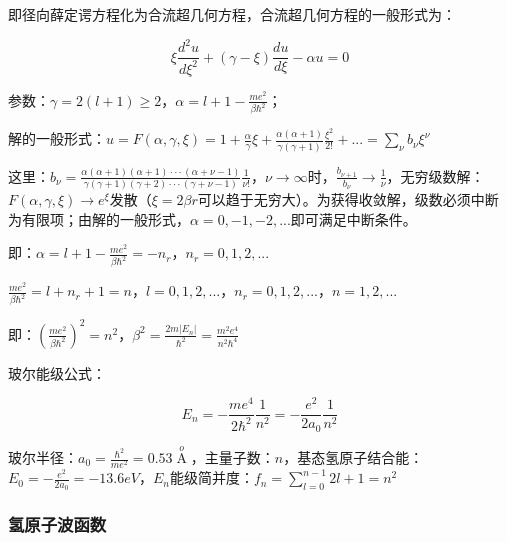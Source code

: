 即径向薛定谔方程化为合流超几何方程，合流超几何方程的一般形式为：


\begin{equation}\label{15-13}
\xi \frac{{d^2 u}}{{d\xi ^2 }} + \left( {\gamma  - \xi } \right)\frac{{du}}{{d\xi }} - \alpha u = 0
\end{equation}

参数：$\gamma  = 2(l + 1) \ge 2$，$\alpha  = l + 1 - \frac{{me^2 }}{{\beta \hbar ^2 }}$；

解的一般形式：$u = F\left( {\alpha ,\gamma ,\xi } \right) = 1 + \frac{\alpha }{\gamma }\xi  + \frac{{\alpha \left( {\alpha  + 1} \right)}}{{\gamma \left( {\gamma  + 1} \right)}}\frac{{\xi ^2 }}{{2!}} + ... = \sum\limits_\nu  {b_\nu  \xi ^\nu  } $

这里：$b_\nu   = \frac{{\alpha \left( {\alpha  + 1} \right)\left( {\alpha  + 1} \right) \cdot  \cdot  \cdot \left( {\alpha  + \nu  - 1} \right)}}{{\gamma \left( {\gamma  + 1} \right)\left( {\gamma  + 2} \right) \cdot  \cdot  \cdot \left( {\gamma  + \nu  - 1} \right)}}\frac{1}{{\nu !}}$，$\nu  \to \infty $时，$\frac{{b_{\nu  + 1} }}{{b_\nu  }} \to \frac{1}{\nu }$，无穷级数解：$F\left( {\alpha ,\gamma ,\xi } \right) \to e^\xi  $发散（$\xi  = 2\beta r$可以趋于无穷大）。为获得收敛解，级数必须中断为有限项；由解的一般形式，$\alpha  = 0, - 1, - 2,...$即可满足中断条件。

即：$\alpha  = l + 1 - \frac{{me^2 }}{{\beta \hbar ^2 }} =  - n_r $，$n_r  = 0,1,2,...$


$\frac{{me^2 }}{{\beta \hbar ^2 }} = l + n_r  + 1 = n$，$l = 0,1,2,...$，$n_r  = 0,1,2,...$，$n = 1,2,...$

即：$\left( {\frac{{me^2 }}{{\beta \hbar ^2 }}} \right)^2  = n^2 $，$\beta ^2  = \frac{{2m\left| {E_n } \right|}}{{\hbar ^2 }} = \frac{{m^2 e^4 }}{{n^2 \hbar ^4 }}$

玻尔能级公式：

\begin{equation}\label{15-14}
E_n  =  - \frac{{me^4 }}{{2\hbar ^2 }}\frac{1}{{n^2 }} =  - \frac{{e^2 }}{{2a_0 }}\frac{1}{{n^2 }}
\end{equation}

玻尔半径：$a_0  = \frac{{\hbar ^2 }}{{me^2 }} = 0.53\mathop A\limits^o $，主量子数：$n$，基态氢原子结合能：$E_0  =  - \frac{{e^2 }}{{2a_0 }} =  - 13.6eV$，$E_n$能级简并度：$f_n  = \sum\limits_{l = 0}^{n - 1} {2l + 1}  = n^2 $


\subsubsection{氢原子波函数}

